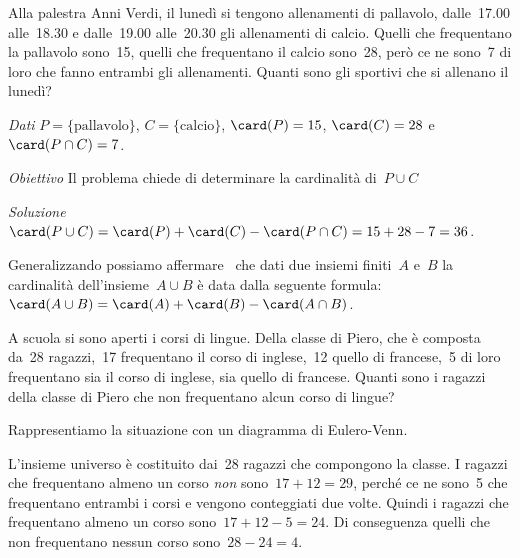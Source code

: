 {\begin{esempio}
\mbox{}

\begin{minipage}{.59 \textwidth}
 Alla palestra Anni Verdi, il lunedì si tengono allenamenti di pallavolo, 
 dalle~17.00 alle~18.30 e dalle~19.00 alle~20.30 gli allenamenti di calcio. 
 Quelli che frequentano la pallavolo sono~15, quelli che frequentano il 
calcio  sono~28, però ce ne sono~7 di loro che fanno entrambi gli 
allenamenti. 
 Quanti sono gli sportivi che si allenano il lunedì?
\end{minipage}
\hfill
\begin{minipage}{.39 \textwidth}
\begin{center}
 
 \end{center}
\end{minipage}

\emph{Dati} \(P=\{\text{pallavolo}\}\), 
 \(C=\{\text{calcio}\}\), \(\card(P)=15\), 
 \(\card(C)=28\) e~\(\card(P\cap C)=7\).
 
\emph{Obiettivo} Il problema chiede di determinare la cardinalità 
di~\(P\cup C\) 

\emph{Soluzione} 
 \(\card(P\cup C)=\card(P)+\card(C)-\card(P\cap C)=15+28-7=36\).

Generalizzando possiamo affermare \ che dati due insiemi finiti~\(A\) 
e~\(B\) la cardinalità dell'insieme~\(A\cup B\) è data dalla seguente 
formula: \(\card(A\cup B)=\card(A)+\card(B)-\card(A\cap B)\).
\end{esempio}

\begin{esempio}
 A scuola si sono aperti i corsi di lingue. Della classe di Piero, che è 
 composta da~28 ragazzi,~17 frequentano il corso di inglese,~12
quello di francese,~5 di loro frequentano sia il corso di inglese, sia 
quello di francese. Quanti sono i ragazzi della classe di Piero che non
frequentano alcun corso di lingue?

Rappresentiamo la situazione con un diagramma di Eulero-Venn.

\begin{minipage}{.59 \textwidth}
L'insieme universo è costituito dai~28 ragazzi che
compongono la classe. I ragazzi che frequentano almeno un corso \emph{non} 
sono~\(17+12=29\), perché ce ne sono~5 che frequentano entrambi i corsi e
vengono conteggiati due volte. Quindi i ragazzi che frequentano almeno un 
corso sono~\(17+12-5=24\). Di conseguenza quelli che non frequentano
nessun corso sono~\(28-24=4\).
\end{minipage}
\hfill
\begin{minipage}{.39 \textwidth}
\begin{center}
 
 \end{center}
\end{minipage}
\end{esempio}

}
